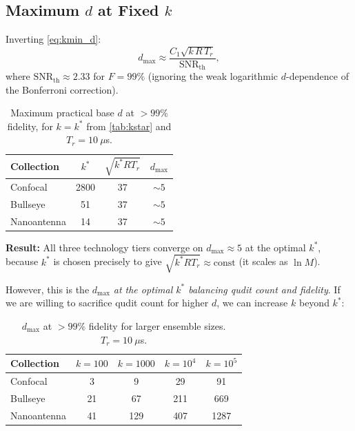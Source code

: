 \documentclass[11pt,letterpaper]{article}
\begin{document}
\subsection{Maximum $d$ at Fixed $k$}

Inverting \cref{eq:kmin_d}:
\begin{equation}
  d_{\max} \approx \frac{C_1 \sqrt{k \, R \, T_r}}{\text{SNR}_{\text{th}}},
\end{equation}
where $\text{SNR}_{\text{th}} \approx 2.33$ for $F = 99\%$ (ignoring the
weak logarithmic $d$-dependence of the Bonferroni correction).

\begin{table}[h]
\centering
\caption{Maximum practical base $d$ at $> 99\%$ fidelity, for $k = k^*$ from
\cref{tab:kstar} and $T_r = 10~\mu$s.}
\label{tab:dmax}
\begin{tabular}{lccc}
\toprule
\textbf{Collection} & $k^*$ & $\sqrt{k^* R T_r}$ & $d_{\max}$ \\
\midrule
Confocal & 2800 & 37 & $\sim 5$ \\
Bullseye & 51 & 37 & $\sim 5$ \\
Nanoantenna & 14 & 37 & $\sim 5$ \\
\bottomrule
\end{tabular}
\end{table}

\textbf{Result:} All three technology tiers converge on $d_{\max} \approx 5$
at the optimal $k^*$, because $k^*$ is chosen precisely to give
$\sqrt{k^* R T_r} \approx \text{const}$ (it scales as $\ln M$).

However, this is the $d_{\max}$ \emph{at the optimal $k^*$ balancing qudit
count and fidelity}.  If we are willing to sacrifice qudit count for higher
$d$, we can increase $k$ beyond $k^*$:

\begin{table}[h]
\centering
\caption{$d_{\max}$ at $> 99\%$ fidelity for larger ensemble sizes.
$T_r = 10~\mu$s.}
\label{tab:dmax_largek}
\begin{tabular}{lcccc}
\toprule
\textbf{Collection} & $k = 100$ & $k = 1000$ & $k = 10^4$ & $k = 10^5$ \\
\midrule
Confocal & 3 & 9 & 29 & 91 \\
Bullseye & 21 & 67 & 211 & 669 \\
Nanoantenna & 41 & 129 & 407 & 1287 \\
\bottomrule
\end{tabular}
\end{table}
\end{document}
